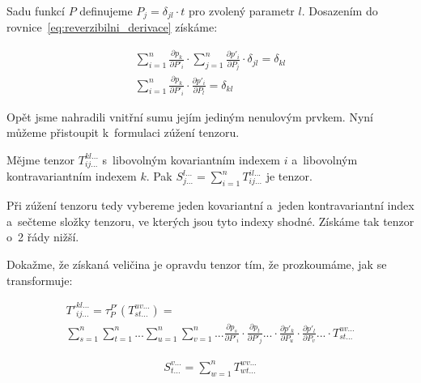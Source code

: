 Sadu funkcí \(P\) definujeme \(P_j = \delta_{jl} \cdot t\) pro zvolený parametr \(l\). Dosazením do rovnice~\eqref{eq:reverzibilni_derivace} získáme:

\begin{equation}
\label{eq:vztah_mezi_bazemi}
\begin{split}
\sum_{i=1}^n \frac{\partial p_k}{\partial P'_i} \cdot \sum_{j=1}^n \frac{\partial p'_i}{\partial P_j} \cdot \delta_{jl} = \delta_{kl} \\
\sum_{i=1}^n \frac{\partial p_k}{\partial P'_i} \cdot \frac{\partial p'_i}{\partial P_l} = \delta_{kl}
\end{split}
\end{equation}

Opět jsme nahradili vnitřní sumu jejím jediným nenulovým prvkem. Nyní můžeme přistoupit k~formulaci zúžení tenzoru. 

\begin{fact}
Mějme tenzor \(T_{ij...}^{kl...}\) s~libovolným kovariantním indexem \(i\) a~libovolným kontravariantním indexem \(k\). Pak \(S_{j...}^{l...} = \sum_{i=1}^n T_{ij...}^{il...}\) je tenzor.
\end{fact}

Při zúžení tenzoru tedy vybereme jeden kovariantní a~jeden kontravariantní index a~sečteme složky tenzoru, ve kterých jsou tyto indexy shodné. Získáme tak tenzor o~2 řády nižší.

Dokažme, že získaná veličina je opravdu tenzor tím, že prozkoumáme, jak se transformuje:

\begin{equation}
\begin{split}
T'^{kl...}_{ij...} = \tau_P^{P'} (T_{st...}^{uv...}) = \\
\sum_{s=1}^n \sum_{t=1}^n ... \sum_{u=1}^n \sum_{v=1}^n ... \frac{\partial p_s}{\partial P'_i} \cdot \frac{\partial p_t}{\partial P'_j} ... \cdot \frac{\partial p'_k}{\partial P_u} \cdot \frac{\partial p'_l}{\partial P_v} ... \cdot T_{st...}^{uv...}
\end{split}
\end{equation}

\begin{equation}
\begin{split}
S_{t...}^{v...} = \sum_{w=1}^n T_{wt...}^{wv...}
\end{split}
\end{equation}


